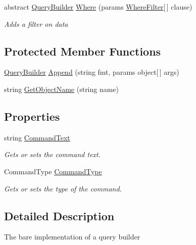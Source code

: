\begin{DoxyCompactItemize}
abstract \hyperlink{classOTA_1_1Data_1_1QueryBuilder}{Query\+Builder} \hyperlink{classOTA_1_1Data_1_1QueryBuilder_a5d4c52ca2c95355a5eddfc53fcf4316d}{Where} (params \hyperlink{structOTA_1_1Data_1_1WhereFilter}{Where\+Filter}\mbox{[}$\,$\mbox{]} clause)
\begin{DoxyCompactList}\small\item\em Adds a filter on data \end{DoxyCompactList}\end{DoxyCompactItemize}
\subsection*{Protected Member Functions}
\begin{DoxyCompactItemize}
\item 
\hyperlink{classOTA_1_1Data_1_1QueryBuilder}{Query\+Builder} \hyperlink{classOTA_1_1Data_1_1QueryBuilder_af89af36b46e3abd1a3120e1d7b6c972d}{Append} (string fmt, params object\mbox{[}$\,$\mbox{]} args)
\item 
string \hyperlink{classOTA_1_1Data_1_1QueryBuilder_a504fca6a98ccf4c5f066c262b92190f0}{Get\+Object\+Name} (string name)
\end{DoxyCompactItemize}
\subsection*{Properties}
\begin{DoxyCompactItemize}
\item 
string \hyperlink{classOTA_1_1Data_1_1QueryBuilder_afc7d200cbb2a51b12324da08e1dce3b9}{Command\+Text}
\begin{DoxyCompactList}\small\item\em Gets or sets the command text. \end{DoxyCompactList}\item 
Command\+Type \hyperlink{classOTA_1_1Data_1_1QueryBuilder_a2e9ad610a470cda1c0a0be926086019c}{Command\+Type}
\begin{DoxyCompactList}\small\item\em Gets or sets the type of the command. \end{DoxyCompactList}\end{DoxyCompactItemize}


\subsection{Detailed Description}
The bare implementation of a query builder 



